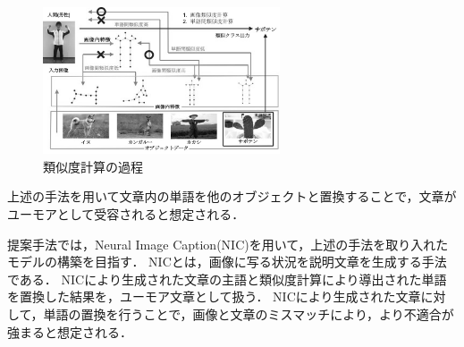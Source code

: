 \documentclass[twocolumn,2pt]{jarticle}
\begin{document}
\begin{figure}
	\begin{center}
		\includegraphics[width=7cm]{images/flow_gray.jpg}
		\caption{類似度計算の過程}
		\label{fig:flow}
	\end{center}
\end{figure}



上述の手法を用いて文章内の単語を他のオブジェクトと置換することで，文章がユーモアとして受容されると想定される．


提案手法では，Neural Image Caption(NIC)\cite{NIC}を用いて，上述の手法を取り入れたモデルの構築を目指す．
NICとは，画像に写る状況を説明文章を生成する手法である．
NICにより生成された文章の主語と類似度計算により導出された単語を置換した結果を，ユーモア文章として扱う．
NICにより生成された文章に対して，単語の置換を行うことで，画像と文章のミスマッチにより，より不適合が強まると想定される．







\end{document}
